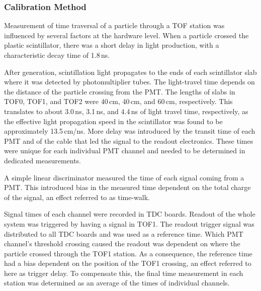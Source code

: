 \subsubsection{Calibration Method}

Measurement of time traversal of a particle through a TOF station was
influenced by several factors at the hardware level. When a particle
crossed the plastic scintillator, there was a short delay in light
production, with a characteristic decay time of 1.8\,ns.

After generation, scintillation light propagates to the ends of each
scintillator slab where it was detected by photomultiplier tubes. The
light-travel time depends on the distance of the particle crossing
from the PMT. The lengths of slabs in TOF0, TOF1, and TOF2 were 40\,cm,
40\,cm, and 60\,cm, respectively. This translates to about 3.0\,ns, 3.1\,ns,
and 4.4\,ns of light travel time, respectively, as the effective light
propagation speed in the scintillator was found to be approximately
13.5\,cm/ns.  More delay was introduced by the transit time of each PMT
and of the cable that led the signal to the readout electronics. These
times were unique for each individual PMT channel and needed to be
determined in dedicated measurements.

A simple linear discriminator measured the time of each signal coming from a PMT.
This introduced bias in the measured time dependent on the total charge of the signal, an effect referred to as time-walk.

Signal times of each channel were recorded in TDC boards. Readout of
the whole system was triggered by having a signal in TOF1. The
readout trigger signal was distributed to all TDC boards and was used as
a reference time. Which PMT channel's threshold crossing caused the
readout was dependent on where the particle crossed through the TOF1
station. As a consequence, the reference time had a bias dependent on
the position of the TOF1 crossing, an effect referred to here as trigger
delay. To compensate this, the final time measurement in each station was determined as an average of the times of individual channels.

